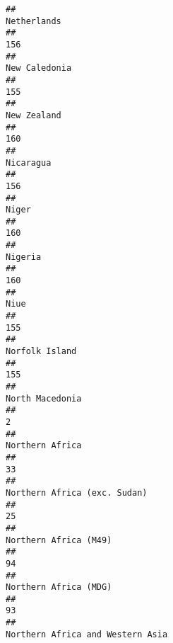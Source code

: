 \documentclass[]{article}
\begin{document}
\begin{verbatim}
##                                                                                  Netherlands 
##                                                                                          156 
##                                                                                New Caledonia 
##                                                                                          155 
##                                                                                  New Zealand 
##                                                                                          160 
##                                                                                    Nicaragua 
##                                                                                          156 
##                                                                                        Niger 
##                                                                                          160 
##                                                                                      Nigeria 
##                                                                                          160 
##                                                                                         Niue 
##                                                                                          155 
##                                                                               Norfolk Island 
##                                                                                          155 
##                                                                              North Macedonia 
##                                                                                            2 
##                                                                              Northern Africa 
##                                                                                           33 
##                                                                 Northern Africa (exc. Sudan) 
##                                                                                           25 
##                                                                        Northern Africa (M49) 
##                                                                                           94 
##                                                                        Northern Africa (MDG) 
##                                                                                           93 
##                                                             Northern Africa and Western Asia 

\end{verbatim}
\end{document}
